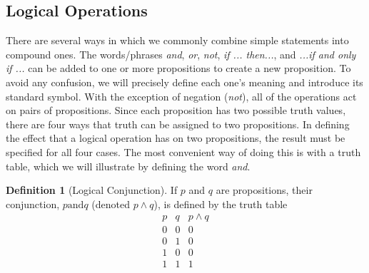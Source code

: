\documentclass[10pt,]{book}
\theoremstyle{plain}
\theoremstyle{definition}
\newtheorem{definition}[theorem]{Definition}
\theoremstyle{definition}
\theoremstyle{definition}
\theoremstyle{definition}
\begin{document}
\subsection[Logical Operations]{Logical Operations}\label{ss-logical-operations}
There are several ways in which we commonly combine simple statements into compound ones. The words/phrases \emph{and}, \emph{or}, \emph{not}, \emph{if ... then...}, and \emph{...if and only if ...} can be added to one or more propositions to create a new proposition. To avoid any confusion, we will precisely define each one's meaning and introduce its standard symbol.  With the exception of negation (\emph{not}), all
of the operations act on pairs of propositions. Since each proposition has two possible truth values, there are four ways that truth can be assigned to two propositions. In defining the effect that a logical operation has on two propositions, the result must be specified for all four cases. The most convenient way of doing this is with a truth table, which we will illustrate by defining the word \emph{and}.%
\begin{definition}[Logical Conjunction]\label{def-conjunction}
\label{notation-1}
 If \(p\) and \(q\) are propositions, their conjunction, \(p \textrm{and} q\) (denoted \(p \land q\)), is defined by the truth table \begin{equation*}
\begin{array}{ccc}
 p & q & p\land q \\
 \hline
 0 & 0 & 0 \\
 0 & 1 & 0 \\
 1 & 0 & 0 \\
 1 & 1 & 1 \\
\end{array}
\end{equation*}
%
\end{definition}
\par
\end{document}
